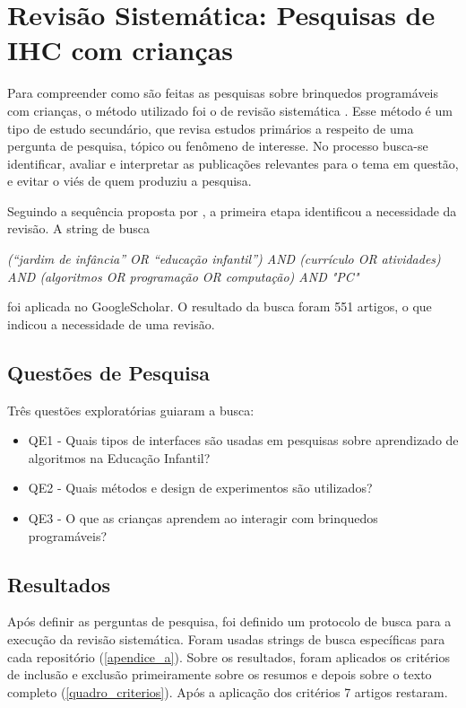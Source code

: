 \section{Revisão Sistemática: Pesquisas de IHC com crianças}
\label{sec_rsl}
Para compreender como são feitas as pesquisas sobre brinquedos programáveis com crianças, o método utilizado foi o de revisão sistemática \cite{kitchenham_guidelines_2007}. Esse método é um tipo de estudo secundário, que revisa estudos primários a respeito de uma pergunta de pesquisa, tópico ou fenômeno de interesse. No processo busca-se identificar, avaliar e interpretar as publicações relevantes para o tema em questão, e evitar o viés de quem produziu a pesquisa.

Seguindo a sequência proposta por , a primeira etapa identificou a necessidade da revisão. A string de busca 

\textit
{
    (“jardim de infância” OR “educação infantil”) AND (currículo OR atividades) AND (algoritmos OR programação OR computação) AND "\acl{PC}"
}

foi aplicada no GoogleScholar. O resultado da busca foram 551 artigos, o que indicou a necessidade de uma revisão.

\subsection{Questões de Pesquisa}
Três questões exploratórias guiaram a busca:

\begin{itemize}
    \item QE1 - Quais tipos de interfaces são usadas em pesquisas sobre aprendizado de algoritmos na Educação Infantil? 
    \item QE2 - Quais métodos e design de experimentos são utilizados?
    \item QE3 - O que as crianças aprendem ao interagir com brinquedos programáveis?
\end{itemize}

\subsection{Resultados}

Após definir as perguntas de pesquisa, foi definido um protocolo de busca para a execução da revisão sistemática. Foram usadas strings de busca específicas para cada repositório (\autoref{apendice_a}). Sobre os resultados, foram aplicados os critérios de inclusão e exclusão primeiramente sobre os resumos e depois sobre o texto completo (\autoref{quadro_criterios}). Após a aplicação dos critérios 7 artigos restaram.

